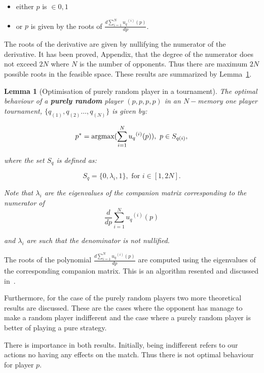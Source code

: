 \documentclass[10pt]{article}
\newtheorem{lemma}[theorem]{Lemma}
\begin{document}
\begin{itemize}
    \item either \(p\) is \(\in {0, 1}\)
    \item or \(p\) is given by the roots of \(\frac{d \sum\limits_{i=1} ^ {N} {u_q}^{(i)} (p)}{dp}\).
\end{itemize}

The roots of the derivative are given by nullifying the numerator of the derivative.
It has been proved, Appendix, that the degree of the numerator does not exceed
\(2 N\) where \(N\) is the number of opponents. Thus there are maximum \(2N\) possible
roots in the feasible space. These results are summarized by Lemma~\ref{lemma:purely_optimisation}.

\begin{lemma}[Optimisation of purely random player in a tournament]
    \label{lemma:purely_optimisation}
    The optimal behaviour of a \textbf{purely random} player \((p, p, p, p)\)
    in an \(N-\)memory one player tournament, \(\{q_{(1)}, q_{(2)} \dots,q_{(N)} \}
    \) is given by:
    
    \[p^* = \textnormal{argmax}(\sum_{i=1} ^ {N} {u_q}^{(i)} (p) ), \ p \in S_{q(i)},\]
    
    where the set \(S_{q}\) is defined as:
    
    \[S_{q} = \{0, \lambda_i, 1\},\text{ for } i \in [1, 2N].\]

    Note that \(\lambda_i\) are the eigenvalues of the companion matrix corresponding
    to the numerator of \[\frac{d}{dp} \sum_{i=1} ^ {N} {u_q}^{(i)} (p)\]

    and \(\lambda_i\) are such that the denominator is not nullified.
    \end{lemma}

The roots of the polynomial \(\frac{d \sum\limits_{i=1} ^ {N} {u_q}^{(i)} (p)}{dp}\)
are computed using the eigenvalues of the corresponding companion matrix. This is
an algorithm resented and discussed in~\cite{Edelman1995}.

Furthermore, for the case of the purely random players two more theoretical results
are discussed. These are the cases where the opponent has manage to make a random
player indifferent and the case where a purely random player is better of playing
a pure strategy.

There is importance in both results. Initially, being indifferent refers to our
actions no having any effects on the match. Thus there is not optimal behaviour
for player \(p\).
\end{document}
